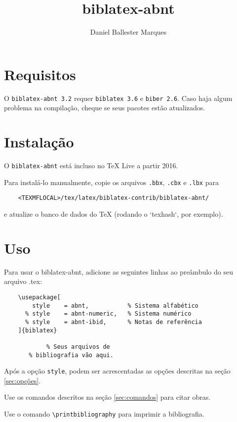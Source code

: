 \documentclass[a4paper]{article}
\title{biblatex-abnt \version}
\author{Daniel Ballester Marques}
\newcommand{\version}{3.2}
\newcommand{\requirements}{\texttt{biblatex 3.6} e \texttt{biber 2.6}}
\begin{document}

\maketitle

\tableofcontents

\clearpage
\section{Requisitos}%

O \texttt{biblatex-abnt \version} requer \requirements. Caso haja algum
problema na compilação, cheque se seus pacotes estão atualizados.

\section{Instalação}%

O \texttt{biblatex-abnt} está incluso no TeX Live a partir 2016.

Para instalá-lo manualmente, copie os arquivos \texttt{.bbx}, \texttt{.cbx} e
\texttt{.lbx} para
\begin{verbatim}
    <TEXMFLOCAL>/tex/latex/biblatex-contrib/biblatex-abnt/
\end{verbatim}
e atualize o banco de dados do TeX (rodando o `texhash`, por exemplo).

\section{Uso}%

Para usar o {biblatex-abnt}, adicione as seguintes linhas ao preâmbulo do seu
arquivo {.tex}:

\begin{verbatim}
    \usepackage[
        style    = abnt,           % Sistema alfabético
      % style    = abnt-numeric,   % Sistema numérico
      % style    = abnt-ibid,      % Notas de referência
    ]{biblatex}

            % Seus arquivos de
       % bibliografia vão aqui.
\end{verbatim}

Após a opção \texttt{style}, podem ser acrescentadas
as opções descritas na seção \ref{sec:opções}.

Use os comandos descritos na seção \ref{sec:comandos} para citar obras.

Use o comando \verb"\printbibliography" para imprimir a bibliografia.
\end{document}
